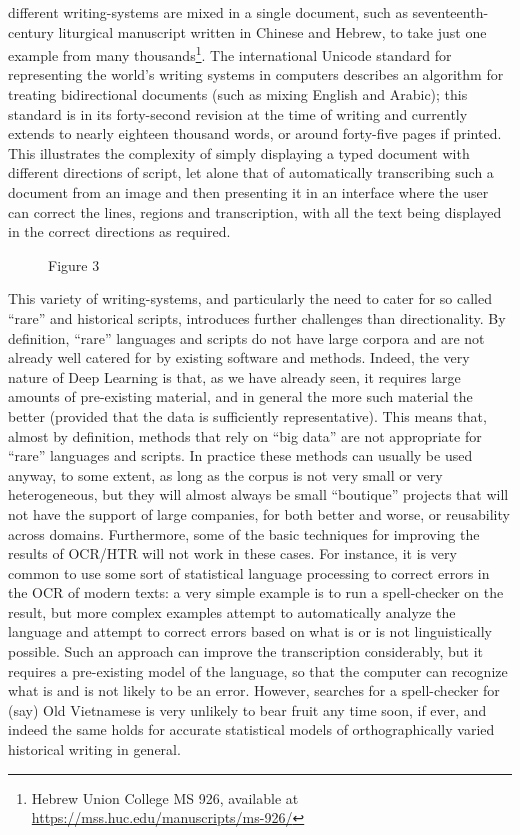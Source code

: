 different writing-systems are mixed in a single document, such as
seventeenth-century liturgical manuscript written in Chinese and Hebrew, to
take just one example from many thousands\footnote{Hebrew Union College MS 926,
available at \url{https://mss.huc.edu/manuscripts/ms-926/}}. The international
Unicode standard for representing the world’s writing systems in computers
describes an algorithm for treating bidirectional documents (such as mixing
English and Arabic); this standard is in its forty-second revision at the time
of writing and currently extends to nearly eighteen thousand words, or around
forty-five pages if printed. This illustrates the complexity of simply
displaying a typed document with different directions of script, let alone that
of automatically transcribing such a document from an image and then presenting
it in an interface where the user can correct the lines, regions and
transcription, with all the text being displayed in the correct directions as
required.

\begin{figure}[h]
	\caption{Figure 3}
	\label{fig:fig3}
\end{figure}

This variety of writing-systems, and particularly the need to cater for so
called “rare” and historical scripts, introduces further challenges than
directionality. By definition, “rare” languages and scripts do not have large
corpora and are not already well catered for by existing software and methods.
Indeed, the very nature of Deep Learning is that, as we have already seen, it
requires large amounts of pre-existing material, and in general the more such
material the better (provided that the data is sufficiently representative).
This means that, almost by definition, methods that rely on “big data” are not
appropriate for “rare” languages and scripts. In practice these methods can
usually be used anyway, to some extent, as long as the corpus is not very small
or very heterogeneous, but they will almost always be small “boutique” projects
that will not have the support of large companies, for both better and worse,
or reusability across domains. Furthermore, some of the basic techniques for
improving the results of OCR/HTR will not work in these cases. For instance, it
is very common to use some sort of statistical language processing to correct
errors in the OCR of modern texts: a very simple example is to run a
spell-checker on the result, but more complex examples attempt to automatically
analyze the language and attempt to correct errors based on what is or is not
linguistically possible. Such an approach can improve the transcription
considerably, but it requires a pre-existing model of the language, so that the
computer can recognize what is and is not likely to be an error. However,
searches for a spell-checker for (say) Old Vietnamese is very unlikely to bear
fruit any time soon, if ever, and indeed the same holds for accurate
statistical models of orthographically varied historical writing in general.


